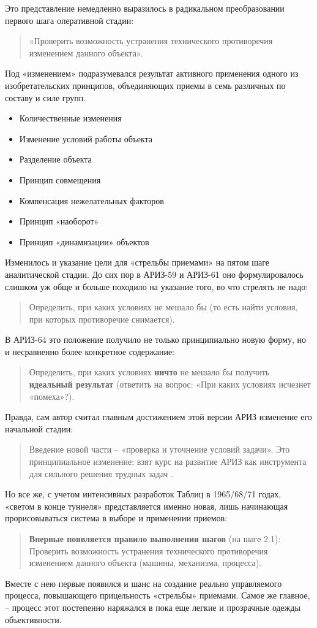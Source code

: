 \documentclass[11pt,a4paper]{article}
\begin{document}
Это представление немедленно выразилось в радикальном преобразовании первого
шага оперативной стадии:
\begin{quote}
  «Проверить возможность устранения технического противоречия изменением
  данного объекта».
\end{quote}
Под «изменением» подразумевался результат активного применения одного из
изобретательских принципов, объединяющих приемы в семь различных по составу и
силе групп.
\begin{itemize}
\item[] Количественные изменения
\item[] Изменение условий работы объекта
\item[] Разделение объекта
\item[] Принцип совмещения
\item[] Компенсация нежелательных факторов
\item[] Принцип «наоборот»
\item[] Принцип «динамизации» объектов
\end{itemize}
Изменилось и указание цели для «стрельбы приемами» на пятом шаге аналитической
стадии. До сих пор в АРИЗ-59 и АРИЗ-61 оно формулировалось слишком уж обще и
больше походило на указание того, во что стрелять не надо:
\begin{quote}
  Определить, при каких условиях не мешало бы (то есть найти условия, при
  которых противоречие снимается).
\end{quote}
В АРИЗ-64 это положение получило не только принципиально новую форму, но и
несравненно более конкретное содержание:
\begin{quote}
  Определить, при каких условиях \textbf{ничто} не мешало бы получить
  \textbf{идеальный результат} (ответить на вопрос: «При каких условиях
  исчезнет «помеха»?).
\end{quote}
Правда, сам автор считал главным достижением этой версии АРИЗ изменение его
начальной стадии:
\begin{quote}  
  Введение новой части -- «проверка и уточнение условий задачи». Это
  принципиальное изменение: взят курс на развитие АРИЗ как инструмента для
  сильного решения трудных задач \cite{Altshuller1986a}.
\end{quote}
Но все же, с учетом интенсивных разработок Таблиц в 1965/68/71 годах, «светом
в конце туннеля» представляется именно новая, лишь начинающая прорисовываться
система в выборе и применении приемов:
\begin{quote}
  \textbf{Впервые появляется правило выполнения шагов} (на шаге 2.1):
  Проверить возможность устранения технического противоречия изменением
  данного объекта (машины, механизма, процесса).
\end{quote}
Вместе с нею первые появился и шанс на создание реально управляемого процесса,
повышающего прицельность «стрельбы» приемами. Самое же главное, -- процесс
этот постепенно наряжался в пока еще легкие и прозрачные одежды объективности.
\end{document}
